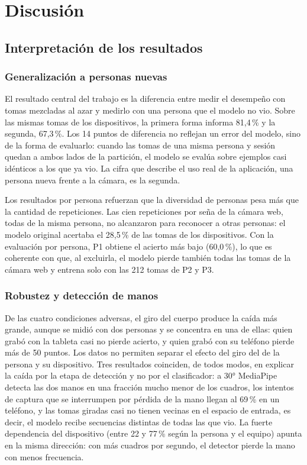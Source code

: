 \chapter{Discusión}
\label{cap:discusion}

\section{Interpretación de los resultados}

\subsection{Generalización a personas nuevas}

El resultado central del trabajo es la diferencia entre medir el desempeño con tomas mezcladas al azar y medirlo con una persona que el modelo no vio. Sobre las mismas tomas de los dispositivos, la primera forma informa 81,4\,\% y la segunda, 67,3\,\%. Los 14 puntos de diferencia no reflejan un error del modelo, sino de la forma de evaluarlo: cuando las tomas de una misma persona y sesión quedan a ambos lados de la partición, el modelo se evalúa sobre ejemplos casi idénticos a los que ya vio. La cifra que describe el uso real de la aplicación, una persona nueva frente a la cámara, es la segunda.

Los resultados por persona refuerzan que la diversidad de personas pesa más que la cantidad de repeticiones. Las cien repeticiones por seña de la cámara web, todas de la misma persona, no alcanzaron para reconocer a otras personas: el modelo original acertaba el 28,5\,\% de las tomas de los dispositivos. Con la evaluación por persona, P1 obtiene el acierto más bajo (60,0\,\%), lo que es coherente con que, al excluirla, el modelo pierde también todas las tomas de la cámara web y entrena solo con las 212 tomas de P2 y P3.

\subsection{Robustez y detección de manos}

De las cuatro condiciones adversas, el giro del cuerpo produce la caída más grande, aunque se midió con dos personas y se concentra en una de ellas: quien grabó con la tableta casi no pierde acierto, y quien grabó con su teléfono pierde más de 50 puntos. Los datos no permiten separar el efecto del giro del de la persona y su dispositivo. Tres resultados coinciden, de todos modos, en explicar la caída por la etapa de detección y no por el clasificador: a 30° MediaPipe detecta las dos manos en una fracción mucho menor de los cuadros, los intentos de captura que se interrumpen por pérdida de la mano llegan al 69\,\% en un teléfono, y las tomas giradas casi no tienen vecinas en el espacio de entrada, es decir, el modelo recibe secuencias distintas de todas las que vio. La fuerte dependencia del dispositivo (entre 22 y 77\,\% según la persona y el equipo) apunta en la misma dirección: con más cuadros por segundo, el detector pierde la mano con menos frecuencia.

